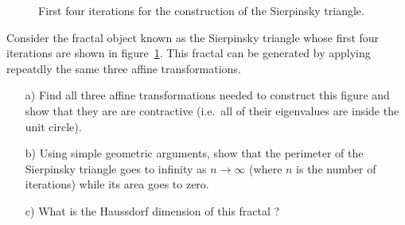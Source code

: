 \bigskip

\begin{figure}
  \centering
  \hfill
  \hfill
  \hfill

  \caption{First four iterations for the construction of the Sierpinsky triangle.}\label{fig: sierpinsky triangle}
\end{figure}

\begin{problem}
  Consider the fractal object known as the Sierpinsky triangle whose first four iterations are shown in figure~\ref{fig: sierpinsky triangle}.
  This fractal can be generated by applying repeatdly the same three affine transformations.

  \begin{enumerate}
  \item[a)] Find all three affine transformations needed to construct this figure and show that they are are contractive (i.e.\ all of their eigenvalues are inside the unit circle).

  \item[b)] Using simple geometric arguments, show that the perimeter of the Sierpinsky triangle goes to infinity as $n \to \infty$ (where $n$ is the number of iterations) while its area goes to zero.

  \item[c)] What is the Haussdorf dimension of this fractal ?
  \end{enumerate}
\end{problem}

